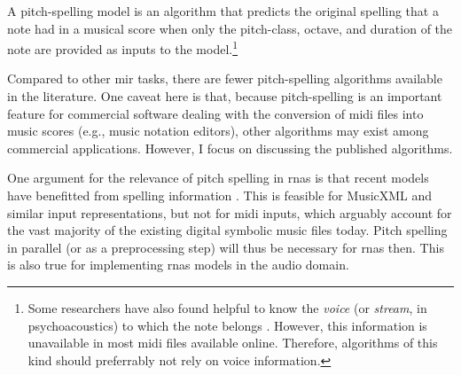 

A pitch-spelling model is an algorithm that predicts the
original spelling that a note had in a musical score when
only the pitch-class, octave, and duration of the note are
provided as inputs to the model.\footnote{Some researchers
have also found helpful to know the \emph{voice} (or
\emph{stream}, in psychoacoustics) to which the note belongs
\parencite{teodoru2007pitch}. However, this information is
unavailable in most \gls{midi} files available online.
Therefore, algorithms of this kind should preferrably not
rely on voice information.}


Compared to other \gls{mir} tasks, there are fewer
pitch-spelling algorithms available in the literature. One
caveat here is that, because pitch-spelling is an important
feature for commercial software dealing with the conversion
of \gls{midi} files into music scores (e.g., music notation
editors), other algorithms may exist among commercial
applications. However, I focus on discussing the published
algorithms.

One argument for the relevance of pitch spelling in
\glspl{rna} is that recent models have benefitted from
spelling information \parencite{micchi2020not}. This is
feasible for MusicXML and similar input representations, but
not for \gls{midi} inputs, which arguably account for the
vast majority of the existing digital symbolic music files
today. Pitch spelling in parallel (or as a preprocessing
step) will thus be necessary for \glspl{rna} then. This is
also true for implementing \glspl{rna} models in the audio
domain.
